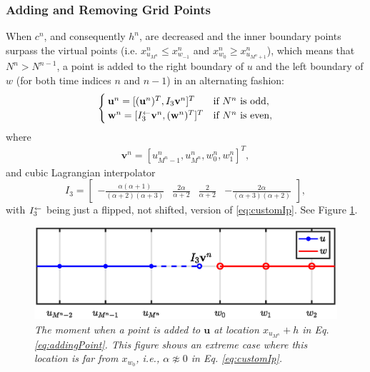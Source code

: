 \subsubsection{Adding and Removing Grid Points}\label{sec:addRemove}
When $c^n$, and consequently $h^n$, are decreased and the inner boundary points surpass the virtual points (i.e. $x_{u_{M^n}}^n \leq x_{w_{-1}}^n$ and $x_{w_0}^n \geq x_{u_{M^n+1}}^n$), which means that $N^n >  N^{n-1}$, a point is added to the right boundary of $u$ and the left boundary of $w$ (for both time indices $n$ and $n-1$) in an alternating fashion: 
\begin{equation}\label{eq:addingPoint}
        \begin{cases}\mathbf{u}^n = [(\mathbf{u}^n)^T, I_3\mathbf{v}^n]^T & \text{if $N^n $ is odd},\\
        \mathbf{w}^n = [I_3^\leftarrow\mathbf{v}^n, (\mathbf{w}^n)^T]^T & \text{if $ N^n$ is even},
        \end{cases}
\end{equation}
where 
\begin{align*}
\mathbf{v}^n = [u_{M^n-1}^n, u_{M^n}^n, w_0^n, w_1^n]^T,%
\end{align*}
and cubic Lagrangian interpolator
\begin{equation}\label{eq:customIp}
    I_3 = \begin{bmatrix} -\frac{\alpha(\alpha+1)}{(\alpha+2)(\alpha+3)} &\frac{2\alpha}{\alpha+2} &\frac{2}{\alpha+2} 
    &-\frac{2\alpha}{(\alpha+3)(\alpha+2)}
    \end{bmatrix},
\end{equation}
with $I_3^\leftarrow$ being just a flipped, not shifted, version of \eqref{eq:customIp}.
See Figure \ref{fig:addingPoint}.
%
\begin{figure}[t]
    \centering
\includegraphics[width=\figwidth\columnwidth]{Figures/addingGridPointNarrow.eps}
\caption{\label{fig:addingPoint}{\it The moment when a point is added to $\mathbf{u}$ at location $x_{u_{M^n}} + h$ in Eq. \eqref{eq:addingPoint}. This figure shows an extreme case where this location is far from $x_{w_0}$, i.e., $\alpha \not\approx 0$ in Eq. \eqref{eq:customIp}.}}
\end{figure}
